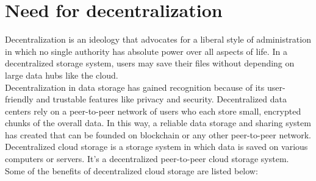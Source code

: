 \section{Need for decentralization}

Decentralization is an ideology that advocates for a liberal style of administration in which no single authority has absolute power over all aspects of life. In a decentralized storage system, users may save their files without depending on large data hubs like the cloud. \\[-8pt]

Decentralization in data storage has gained recognition because of its user-friendly and trustable features like privacy and security. Decentralized data centers rely on a peer-to-peer network of users who each store small, encrypted chunks of the overall data. In this way, a reliable data storage and sharing system has created that can be founded on blockchain or any other peer-to-peer network. \\[-8pt]

Decentralized cloud storage is a storage system in which data is saved on various computers or servers. It’s a decentralized peer-to-peer cloud storage system. \\[-8pt]

\noindent
Some of the benefits of decentralized cloud storage are listed below: \\

